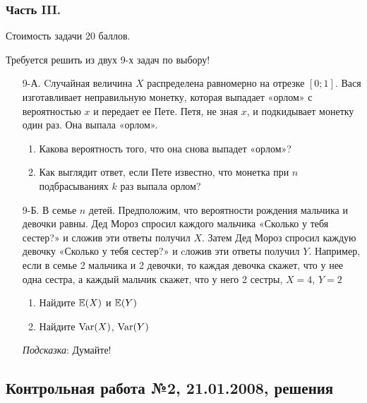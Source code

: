 \subsubsection*{Часть III.}

Стоимость задачи 20 баллов.

Требуется решить \textbf{} из двух 9-х задач по
выбору!

\begin{enumerate}
\item[9-А.] Cлучайная величина $X$ распределена равномерно на отрезке $[0;1]$. Вася изготавливает неправильную монетку, которая выпадает «орлом» с вероятностью  $x$ и передает ее Пете.
Петя, не зная $x$, и подкидывает монетку один раз. Она выпала
«орлом».
\begin{enumerate}
\item Какова вероятность того, что она снова выпадет
«орлом»?
\item Как выглядит ответ, если Пете известно, что монетка при
$n$ подбрасываниях  $k$  раз выпала орлом?
\end{enumerate}

\item[9-Б.] В семье $n$ детей. Предположим, что вероятности рождения мальчика и девочки равны. Дед Мороз спросил каждого мальчика «Сколько у тебя сестер?» и сложив эти ответы получил $X$. Затем Дед Мороз спросил каждую девочку «Сколько у тебя сестер?» и cложив эти ответы получил $Y$. Например, если в семье 2 мальчика и 2 девочки, то каждая девочка скажет, что у нее одна сестра, а каждый мальчик скажет, что у него 2 сестры, $X=4$, $Y=2$
\begin{enumerate}
\item Найдите $\mathbb{E}(X)$ и $\mathbb{E}(Y)$
\item Найдите $\operatorname{Var}(X)$, $\operatorname{Var}(Y)$
\end{enumerate}
\emph{Подсказка}: Думайте!
\end{enumerate}



\subsection{Контрольная работа №2, 21.01.2008, решения}

